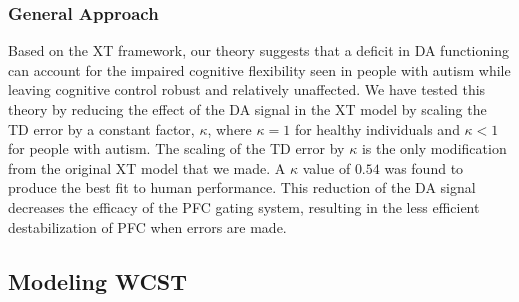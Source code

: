 \subsubsection{General Approach}
Based on the XT framework, our theory suggests that a deficit in DA functioning can account for the impaired cognitive flexibility seen in people with autism while leaving cognitive control robust and relatively unaffected.  We have tested this theory by reducing the effect of the DA signal in the XT model by scaling the TD error by a constant factor, $\kappa$, where $\kappa = 1$ for healthy individuals and $\kappa < 1$ for people with autism.  The scaling of the TD error by $\kappa$ is the only modification from the original XT model that we made.  A $\kappa$ value of $0.54$ was found to produce the best fit to human performance.  This reduction of the DA signal decreases the efficacy of the PFC gating system, resulting in the less efficient destabilization of PFC when errors are made. %


\subsection{Modeling WCST} 

